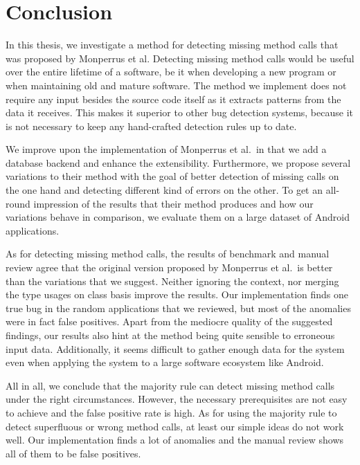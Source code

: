 \chapter{Conclusion}\label{ch:concl}

In this thesis, we investigate a method for detecting missing method calls that was proposed by Monperrus et al.
Detecting missing method calls would be useful over the entire lifetime of a software, be it when developing a new program or when maintaining old and mature software.
The method we implement does not require any input besides the source code itself as it extracts patterns from the data it receives.
This makes it superior to other bug detection systems, because it is not necessary to keep any hand-crafted detection rules up to date.

We improve upon the implementation of Monperrus et al.\ in that we add a database backend and enhance the extensibility.
Furthermore, we propose several variations to their method with the goal of better detection of missing calls on the one hand and detecting different kind of errors on the other.
To get an all-round impression of the results that their method produces and how our variations behave in comparison, we evaluate them on a large dataset of Android applications. 

As for detecting missing method calls, the results of benchmark and manual review agree that the original version proposed by Monperrus et al.\ is better than the variations that we suggest.
Neither ignoring the context, nor merging the type usages on class basis improve the results.
Our implementation finds one true bug in the random applications that we reviewed, but most of the anomalies were in fact false positives.
Apart from the mediocre quality of the suggested findings, our results also hint at the method being quite sensible to erroneous input data.
Additionally, it seems difficult to gather enough data for the system even when applying the system to a large software ecosystem like Android.

All in all, we conclude that the majority rule can detect missing method calls under the right circumstances.
However, the necessary prerequisites are not easy to achieve and the false positive rate is high.
As for using the majority rule to detect superfluous or wrong method calls, at least our simple ideas do not work well.
Our implementation finds a lot of anomalies and the manual review shows all of them to be false positives.

